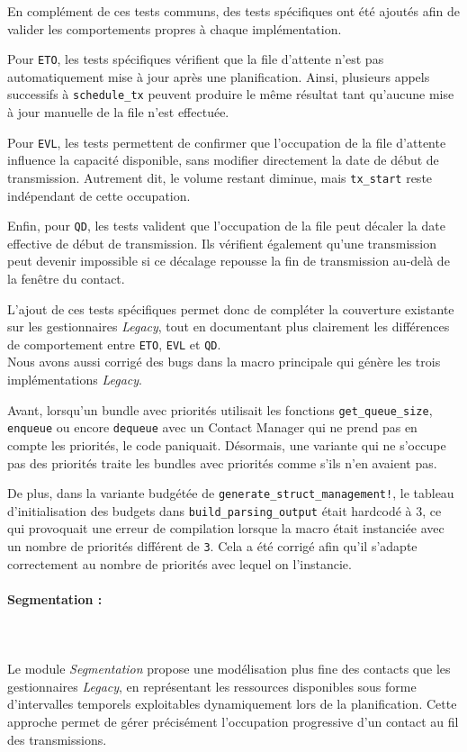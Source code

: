 \documentclass{article}
\begin{document}
En complément de ces tests communs, des tests spécifiques ont été ajoutés afin de valider les comportements propres à chaque implémentation.

Pour \texttt{ETO}, les tests spécifiques vérifient que la file d’attente n’est pas automatiquement mise à jour après une planification. Ainsi, plusieurs appels successifs à \texttt{schedule\_tx} peuvent produire le même résultat tant qu’aucune mise à jour manuelle de la file n’est effectuée.

Pour \texttt{EVL}, les tests permettent de confirmer que l’occupation de la file d’attente influence la capacité disponible, sans modifier directement la date de début de transmission. Autrement dit, le volume restant diminue, mais \texttt{tx\_start} reste indépendant de cette occupation.

Enfin, pour \texttt{QD}, les tests valident que l’occupation de la file peut décaler la date effective de début de transmission. Ils vérifient également qu’une transmission peut devenir impossible si ce décalage repousse la fin de transmission au-delà de la fenêtre du contact.

L’ajout de ces tests spécifiques permet donc de compléter la couverture existante sur les gestionnaires \textit{Legacy}, tout en documentant plus clairement les différences de comportement entre \texttt{ETO}, \texttt{EVL} et \texttt{QD}.\\

Nous avons aussi corrigé des bugs dans la macro principale qui génère les trois implémentations \textit{Legacy}. 

Avant, lorsqu'un \gls{bundle} avec priorités utilisait les fonctions
\texttt{get\_queue\_size}, \texttt{enqueue} ou encore \texttt{dequeue}
avec un Contact Manager qui ne prend pas en compte les priorités,
le code paniquait.
Désormais, une variante qui ne s'occupe pas des priorités traite
les \glspl{bundle} avec priorités comme s'ils n'en avaient pas.

De plus, dans la variante budgétée de \texttt{generate\_struct\_management!},
le tableau d'initialisation des budgets dans \texttt{build\_parsing\_output}
était hardcodé à 3, ce qui provoquait une erreur de
compilation lorsque la macro était instanciée avec un nombre de priorités
différent de \texttt{3}.
Cela a été corrigé afin qu'il s'adapte correctement au nombre de priorités
avec lequel on l'instancie.

\paragraph{Segmentation :}~\\\\
Le module \textit{Segmentation} propose une modélisation plus fine des contacts que les gestionnaires \textit{Legacy}, en représentant les ressources disponibles sous forme d’intervalles temporels exploitables dynamiquement lors de la planification. Cette approche permet de gérer précisément l’occupation progressive d’un contact au fil des transmissions.
\end{document}
